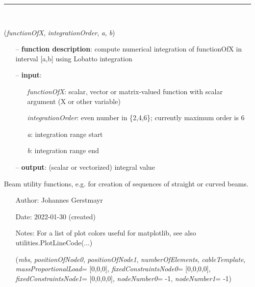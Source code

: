 \begin{itemize}[leftmargin=1.4cm]
\begin{itemize}[leftmargin=0.5cm]
%
\noindent\rule{8cm}{0.75pt}\vspace{1pt} \\ 
\begin{flushleft}
\label{sec:basicUtilities:LobattoIntegrate}
({\it functionOfX}, {\it integrationOrder}, {\it a}, {\it b})
\end{flushleft}
\setlength{\itemindent}{0.7cm}
\begin{itemize}[leftmargin=0.7cm]
  \item[--]  {\bf function description}: compute numerical integration of functionOfX in interval [a,b] using Lobatto integration  \item[--]  {\bf input}: \vspace{-6pt}
  \begin{itemize}[leftmargin=1.2cm]
\setlength{\itemindent}{-0.7cm}
    \item[] {\it functionOfX}: scalar, vector or matrix-valued function with scalar argument (X or other variable)
    \item[] {\it   integrationOrder}: even number in \{2,4,6\}; currently maximum order is 6
    \item[] {\it   a}: integration range start
    \item[] {\it   b}: integration range end
  \end{itemize}
  \item[--]  {\bf output}: (scalar or vectorized) integral value\vspace{12pt}\end{itemize}
%
\label{sec:module:beams}
 	Beam utility functions, e.g. for creation of sequences of straight or curved beams.
\begin{itemize}[leftmargin=1.4cm]
\setlength{\itemindent}{-1.4cm}
\item[]Author:    Johannes Gerstmayr
\item[]Date:      2022-01-30 (created)
\item[]Notes: 	For a list of plot colors useful for matplotlib, see also utilities.PlotLineCode(...)
\ei
\begin{flushleft}
\label{sec:beams:GenerateStraightLineANCFCable2D}
({\it mbs}, {\it positionOfNode0}, {\it positionOfNode1}, {\it numberOfElements}, {\it cableTemplate}, {\it massProportionalLoad}= [0,0,0], {\it fixedConstraintsNode0}= [0,0,0,0], {\it fixedConstraintsNode1}= [0,0,0,0], {\it nodeNumber0}= -1, {\it nodeNumber1}= -1)

\end{flushleft}
\end{itemize}
\end{itemize}
\end{itemize}
